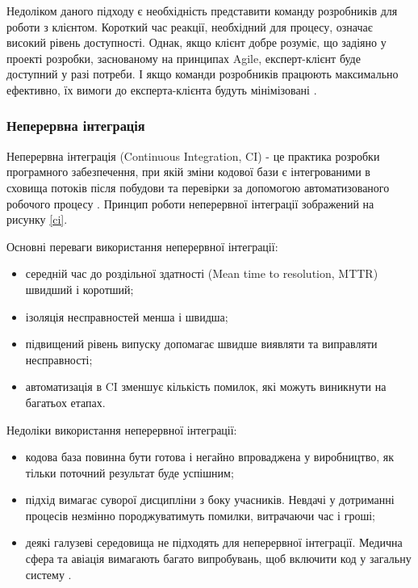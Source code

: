Недоліком даного підходу є необхідність представити команду розробників для роботи з клієнтом.
Короткий час реакції, необхідний для процесу, означає високий рівень доступності.
Однак, якщо клієнт добре розуміє, що задіяно у проекті розробки,
заснованому на принципах Agile, експерт-клієнт буде доступний у разі потреби.
І якщо команди розробників працюють максимально ефективно,
їх вимоги до експерта-клієнта будуть мінімізовані \cite{bdd-article-2}.


\subsubsection{Неперервна інтеграція}

Неперервна інтеграція (Continuous Integration, CI)
- це практика розробки програмного забезпечення,
при якій зміни кодової бази є інтегрованими в сховища потоків після
побудови та перевірки за допомогою автоматизованого робочого процесу \cite{ci-book}.
Принцип роботи неперервної інтеграції зображений на рисунку \ref{ci}.

Основні переваги використання неперервної інтеграції:

\begin{itemize}
		\item середній час до роздільної здатності 
			(Mean time to resolution, MTTR) швидший і коротший;
		\item ізоляція несправностей менша і швидша;
		\item підвищений рівень випуску допомагає швидше виявляти
			та виправляти несправності;
		\item автоматизація в CI зменшує кількість помилок,
			які можуть виникнути на багатьох етапах.
\end{itemize}

Недоліки використання неперервної інтеграції:

\begin{itemize}
		\item кодова база повинна бути готова і негайно впроваджена у виробництво,
			як тільки поточний результат буде успішним;
		\item підхід вимагає суворої дисципліни з боку учасників.
			Невдачі у дотриманні процесів незмінно породжуватимуть помилки,
			витрачаючи час і гроші;
		\item деякі галузеві середовища не підходять для неперервної інтеграції.
			Медична сфера та авіація вимагають багато випробувань,
			щоб включити код у загальну систему \cite{ci-article}.
\end{itemize}


